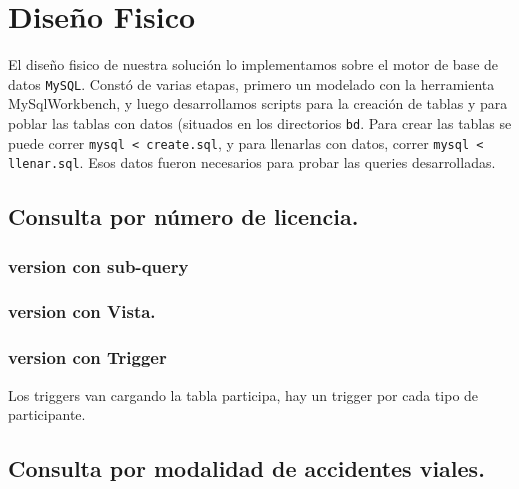 \section{Diseño Fisico}

El diseño fisico de nuestra solución lo implementamos sobre el motor de base de datos \texttt{MySQL}.
Constó de varias etapas, primero un modelado con la
    herramienta MySqlWorkbench, y luego desarrollamos scripts para la creación de tablas
    y para poblar las tablas con datos (situados en los directorios \texttt{bd}.
Para crear las tablas se puede correr \texttt{mysql < create.sql}, y
    para llenarlas con datos, correr \texttt{mysql < llenar.sql}.
Esos datos fueron necesarios para probar las queries desarrolladas.

\subsection{Consulta por número de licencia.}

\subsubsection{version con sub-query}


\subsubsection{version con Vista.}


\subsubsection{version con Trigger}
Los triggers van cargando la tabla participa, hay un trigger por cada tipo de participante.


\subsection{Consulta por modalidad de accidentes viales.}



